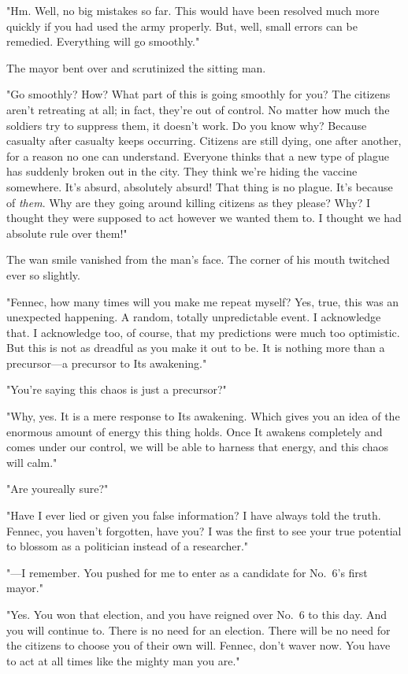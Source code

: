 "Hm. Well, no big mistakes so far. This would have been resolved much
more quickly if you had used the army properly. But, well, small errors
can be remedied. Everything will go smoothly."

The mayor bent over and scrutinized the sitting man.

"Go smoothly? How? What part of this is going smoothly for you? The
citizens aren't retreating at all; in fact, they're out of control. No
matter how much the soldiers try to suppress them, it doesn't work. Do
you know why? Because casualty after casualty keeps occurring. Citizens
are still dying, one after another, for a reason no one can understand.
Everyone thinks that a new type of plague has suddenly broken out in the
city. They think we're hiding the vaccine somewhere. It's absurd,
absolutely absurd! That thing is no plague. It's because of \emph{them}. Why
are they going around killing citizens as they please? Why? I thought
they were supposed to act however we wanted them to. I thought we had
absolute rule over them!"

The wan smile vanished from the man's face. The corner of his mouth
twitched ever so slightly.

"Fennec, how many times will you make me repeat myself? Yes, true, this
was an unexpected happening. A random, totally unpredictable event. I
acknowledge that. I acknowledge too, of course, that my predictions were
much too optimistic. But this is not as dreadful as you make it out to
be. It is nothing more than a precursor---a precursor to Its awakening."

"You're saying this chaos is just a precursor?"

"Why, yes. It is a mere response to Its awakening. Which gives you an
idea of the enormous amount of energy this thing holds. Once It awakens
completely and comes under our control, we will be able to harness that
energy, and this chaos will calm."

"Are you\el really sure?"

"Have I ever lied or given you false information? I have always told the
truth. Fennec, you haven't forgotten, have you? I was the first to see
your true potential to blossom as a politician instead of a researcher."

"---I remember. You pushed for me to enter as a candidate for No.~6's
first mayor."

"Yes. You won that election, and you have reigned over No.~6 to this
day. And you will continue to. There is no need for an election. There
will be no need for the citizens to choose you of their own will.
Fennec, don't waver now. You have to act at all times like the mighty
man you are."

